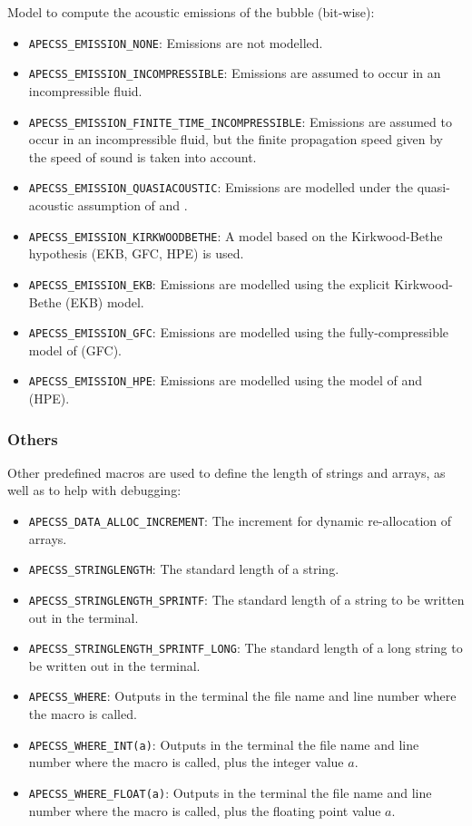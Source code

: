 Model to compute the acoustic emissions of the bubble (bit-wise):\vspace{-1em}
\begin{itemize}[noitemsep]
  \item {\tt APECSS\_EMISSION\_NONE}: Emissions are not modelled.
  \item {\tt APECSS\_EMISSION\_INCOMPRESSIBLE}: Emissions are assumed to occur in an incompressible fluid.
  \item {\tt APECSS\_EMISSION\_FINITE\_TIME\_INCOMPRESSIBLE}: Emissions are assumed to occur in an incompressible fluid, but the finite propagation speed given by the speed of sound is taken into account.
  \item {\tt APECSS\_EMISSION\_QUASIACOUSTIC}: Emissions are modelled under the quasi-acoustic assumption of \citet{Trilling1952} and \citet{Gilmore1952}.
  \item {\tt APECSS\_EMISSION\_KIRKWOODBETHE}: A model based on the Kirkwood-Bethe hypothesis (EKB, GFC, HPE) is used.
  \item {\tt APECSS\_EMISSION\_EKB}: Emissions are modelled using the explicit Kirkwood-Bethe (EKB) model.
  \item {\tt APECSS\_EMISSION\_GFC}: Emissions are modelled using the fully-compressible model of \citet{Gilmore1952} (GFC).
  \item {\tt APECSS\_EMISSION\_HPE}: Emissions are modelled using the model of \citet{Hickling1963} and \citet{Ebeling1978} (HPE).
\end{itemize}


\subsubsection{Others}

Other predefined macros are used to define the length of strings and arrays, as well as to help with debugging:\vspace{-1em}
\begin{itemize}[noitemsep]
  \item {\tt APECSS\_DATA\_ALLOC\_INCREMENT}: The increment for dynamic re-allocation of arrays.
  \item {\tt APECSS\_STRINGLENGTH}: The standard length of a string.
  \item {\tt APECSS\_STRINGLENGTH\_SPRINTF}: The standard length of a string to be written out in the terminal.
  \item {\tt APECSS\_STRINGLENGTH\_SPRINTF\_LONG}: The standard length of a long string to be  written out in the terminal.
  \item {\tt APECSS\_WHERE}: Outputs in the terminal the file name and line number where the macro is called.
  \item {\tt APECSS\_WHERE\_INT(a)}: Outputs in the terminal the file name and line number where the macro is called, plus the integer value $a$.
  \item {\tt APECSS\_WHERE\_FLOAT(a)}: Outputs in the terminal the file name and line number where the macro is called, plus the floating point value $a$.
\end{itemize}


